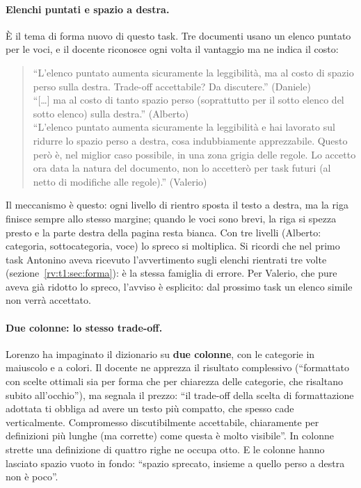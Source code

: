 \paragraph{Elenchi puntati e spazio a destra.} È il tema di forma nuovo di
questo task. Tre documenti usano un elenco puntato per le voci, e il docente
riconosce ogni volta il vantaggio ma ne indica il costo:
\begin{quote}
  ``L'elenco puntato aumenta sicuramente la leggibilità, ma al costo di
  spazio perso sulla destra. Trade-off accettabile? Da discutere.''
  (Daniele)\\
  ``[\dots] ma al costo di tanto spazio perso (soprattutto per il sotto
  elenco del sotto elenco) sulla destra.'' (Alberto)\\
  ``L'elenco puntato aumenta sicuramente la leggibilità e hai lavorato sul
  ridurre lo spazio perso a destra, cosa indubbiamente apprezzabile. Questo
  però è, nel miglior caso possibile, in una zona grigia delle regole. Lo
  accetto ora data la natura del documento, non lo accetterò per task futuri
  (al netto di modifiche alle regole).'' (Valerio)
\end{quote}
Il meccanismo è questo: ogni livello di rientro sposta il testo a destra, ma
la riga finisce sempre allo stesso margine; quando le voci sono brevi, la
riga si spezza presto e la parte destra della pagina resta bianca. Con tre
livelli (Alberto: categoria, sottocategoria, voce) lo spreco si moltiplica. Si
ricordi che nel primo task Antonino aveva ricevuto l'avvertimento sugli
elenchi rientrati tre volte (sezione~\ref{rv:t1:sec:forma}): è la stessa
famiglia di errore. Per Valerio, che pure aveva già ridotto lo spreco,
l'avviso è esplicito: dal prossimo task un elenco simile non verrà accettato.

\paragraph{Due colonne: lo stesso trade-off.} Lorenzo ha impaginato il
dizionario su \textbf{due colonne}, con le categorie in maiuscolo e a colori.
Il docente ne apprezza il risultato complessivo (``formattato con scelte
ottimali sia per forma che per chiarezza delle categorie, che risaltano subito
all'occhio''), ma segnala il prezzo: ``il trade-off della scelta di
formattazione adottata ti obbliga ad avere un testo più compatto, che spesso
cade verticalmente. Compromesso discutibilmente accettabile, chiaramente per
definizioni più lunghe (ma corrette) come questa è molto visibile''. In
colonne strette una definizione di quattro righe ne occupa otto. E le colonne
hanno lasciato spazio vuoto in fondo: ``spazio sprecato, insieme a quello
perso a destra non è poco''.

